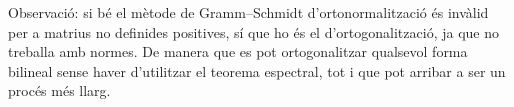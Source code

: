 Observació: si bé el mètode de Gramm--Schmidt d'ortonormalització és invàlid per a matrius no definides positives, sí que ho és el d'ortogonalització, ja que no treballa amb normes. De manera que es pot ortogonalitzar qualsevol forma bilineal sense haver d'utilitzar el teorema espectral, tot i que pot arribar a ser un procés més llarg.